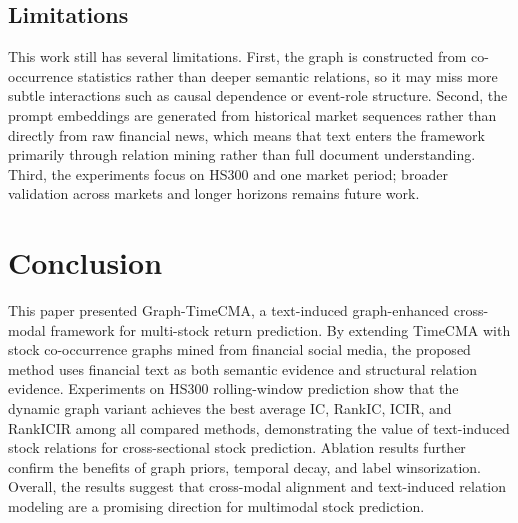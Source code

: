 \subsection{Limitations}

This work still has several limitations. First, the graph is constructed from co-occurrence statistics rather than deeper semantic relations, so it may miss more subtle interactions such as causal dependence or event-role structure. Second, the prompt embeddings are generated from historical market sequences rather than directly from raw financial news, which means that text enters the framework primarily through relation mining rather than full document understanding. Third, the experiments focus on HS300 and one market period; broader validation across markets and longer horizons remains future work.

\section{Conclusion}

This paper presented Graph-TimeCMA, a text-induced graph-enhanced cross-modal framework for multi-stock return prediction. By extending TimeCMA with stock co-occurrence graphs mined from financial social media, the proposed method uses financial text as both semantic evidence and structural relation evidence. Experiments on HS300 rolling-window prediction show that the dynamic graph variant achieves the best average IC, RankIC, ICIR, and RankICIR among all compared methods, demonstrating the value of text-induced stock relations for cross-sectional stock prediction. Ablation results further confirm the benefits of graph priors, temporal decay, and label winsorization. Overall, the results suggest that cross-modal alignment and text-induced relation modeling are a promising direction for multimodal stock prediction.
